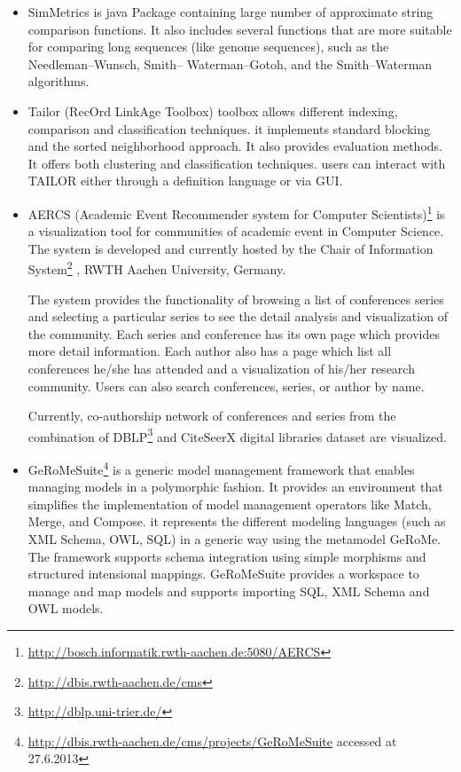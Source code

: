\begin{itemize}
\item SimMetrics is java Package containing large number of approximate string comparison functions. It also includes several functions that are more suitable for comparing long sequences (like genome sequences), such as the Needleman–Wunsch, Smith– Waterman–Gotoh, and the Smith–Waterman algorithms.

\item Tailor (RecOrd LinkAge Toolbox)\cite{EVEl02} toolbox allows different indexing, comparison and classification techniques. it implements standard blocking and the sorted neighborhood approach. It also provides evaluation methods. It offers both clustering and classification techniques. users can interact with TAILOR either through a definition language or via GUI.

\item AERCS (Academic Event Recommender system for Computer Scientists)\footnote{\url{http://bosch.informatik.rwth-aachen.de:5080/AERCS}} is a visualization tool for communities of academic event in Computer Science. The system is developed and currently hosted by the Chair of Information System\footnote{\url{http://dbis.rwth-aachen.de/cms}} , RWTH Aachen University, Germany.  

The system provides the functionality of browsing a list of conferences series and selecting a particular series to see the detail analysis and visualization of the community. Each series and conference has its own page which provides more detail information. Each author also has a page which list all conferences he/she has attended and a visualization of his/her research community. Users can also search conferences, series, or author by name.

Currently, co-authorship network of conferences and series from the combination of DBLP\footnote{\url{http://dblp.uni-trier.de/}} and CiteSeerX digital libraries dataset are visualized. 

\item GeRoMeSuite\footnote{\url{http://dbis.rwth-aachen.de/cms/projects/GeRoMeSuite} accessed at 27.6.2013} is a generic model management framework that enables managing models in a polymorphic fashion. It provides an environment that simplifies the implementation of model management operators like Match, Merge, and Compose. it represents the different modeling languages (such as XML Schema, OWL, SQL) in a generic way using the metamodel GeRoMe. The framework supports schema integration using simple morphisms and structured intensional mappings. GeRoMeSuite provides a workspace to manage and map models and supports importing SQL, XML Schema and OWL models.
\end{itemize}

